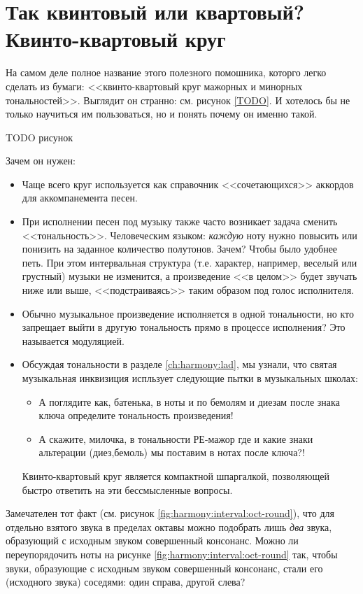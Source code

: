 \section{Так квинтовый или квартовый? Квинто-квартовый круг}
\label{ch:harmony:kvinto-kvarto-round}

На самом деле полное название этого полезного помошника, которго легко сделать из бумаги: <<квинто-квартовый круг мажорных и минорных тональностей>>. Выглядит он странно: см. рисунок \ref{TODO}. И хотелось бы не только научиться им пользоваться, но и понять почему он именно такой.

TODO рисунок

Зачем он нужен:
\begin{itemize}
    \item Чаще всего круг используется как справочник <<сочетающихся>> аккордов для аккомпанемента песен.

    \item При исполнении песен под музыку также часто возникает задача сменить <<тональность>>. Человеческим языком: \emph{каждую} ноту нужно повысить или понизить на заданное количество полутонов. Зачем? Чтобы было удобнее петь. При этом интервальная структура (т.е. характер, например, веселый или грустный) музыки не изменится, а произведение <<в целом>> будет звучать ниже или выше, <<подстраиваясь>> таким образом под голос исполнителя.
    
    \item Обычно музыкальное произведение исполняется в одной тональности, но кто запрещает выйти в другую тональность прямо в процессе исполнения? Это называется модуляцией.
    
    \item Обсуждая тональности в разделе \ref{ch:harmony:lad}, мы узнали, что святая музыкальная инквизиция испльзует следующие пытки в музыкальных школах:
    \begin{itemize}
        \item А поглядите как, батенька, в ноты и по бемолям и диезам после знака ключа определите тональность произведения! 
        \item А скажите, милочка, в тональности РЕ-мажор где и какие знаки альтерации (диез,бемоль) мы поставим в нотах после ключа?!
    \end{itemize}
    Квинто-квартовый круг является компактной шпаргалкой, позволяющей быстро ответить на эти бессмысленные вопросы.
\end{itemize}

Замечателен тот факт (см. рисунок \ref{fig:harmony:interval:oct-round}), что для отдельно взятого звука в пределах октавы можно подобрать лишь \emph{два} звука, образующий с исходным звуком совершенный консонанс. Можно ли переупорядочить ноты на рисунке \ref{fig:harmony:interval:oct-round} так, чтобы звуки, образующие с исходным звуком совершенный консонанс, стали его (исходного звука) соседями: один справа, другой слева?

